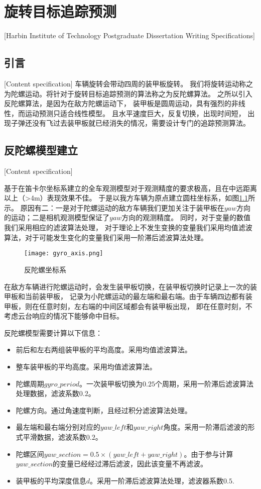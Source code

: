 

\chapter[旋转目标追踪预测]{旋转目标追踪预测}[Harbin Institute of Technology Postgraduate Dissertation Writing Specifications]

\section{引言}[Content specification]
车辆旋转会带动四周的装甲板旋转。
我们将旋转运动称之为陀螺运动。将针对于旋转目标追踪预测的算法称之为反陀螺算法。
之所以引入反陀螺算法，是因为在敌方陀螺运动下，
装甲板是圆周运动，具有强烈的非线性，而运动预测只适合线性模型。
且水平速度巨大，反复切换，出现时间短，
出现子弹还没有飞过去装甲板就已经消失的情况，需要设计专门的追踪预测算法。

\section{反陀螺模型建立}[Content specification]

基于在笛卡尔坐标系建立的全车观测模型对于观测精度的要求极高，且在中远距离以上（>4m）表现效果不佳。
于是以我方车辆为原点建立圆柱坐标系，如图\ref{反陀螺坐标系}所示。
原因有二：一是对于陀螺运动的敌方车辆我们更加关注于装甲板在$yaw$方向的运动；二是相机观测模型保证了$yaw$方向的观测精度。
同时，对于变量的数值我们采用相应的滤波算法处理，
对于理论上不发生变换的变量我们采用均值滤波算法，对于可能发生变化的变量我们采用一阶滞后滤波算法处理。
\begin{figure}[H]
    \centering
    \texttt{[image: gyro\_axis.png]} 
    \caption{反陀螺坐标系} 
    \label{反陀螺坐标系}
\end{figure}



\par
在敌方车辆进行陀螺运动时，会发生装甲板切换，在装甲板切换时记录上一次的装甲板和当前装甲板，
记录为小陀螺运动的最左端和最右端。由于车辆四边都有装甲板，则在任意时刻，左右端的中间区域都会有装甲板出现，
即在任意时刻，不考虑云台响应的情况下能够命中目标。


反陀螺模型需要计算以下信息：
\begin{itemize}[itemindent=2em]
    \item 前后和左右两组装甲板的平均高度。采用均值滤波算法。
    \item 整车装甲板的平均高度。采用均值滤波算法。
    \item 陀螺周期$gyro\_period$。一次装甲板切换为$0.25$个周期，采用一阶滞后滤波算法处理数据，滤波系数$0.2$。
    \item 陀螺方向。通过角速度判断，且经过积分滤波算法处理。
    \item 最左端和最右端分别对应的$yaw\_left$和$yaw\_right$角度。采用一阶滞后滤波的形式平滑数据，滤波系数$0.2$。
    \item 陀螺区间$yaw\_section =0.5 \times (yaw\_left + yaw\_right)$。由于参与计算$yaw\_section$的变量已经经过滞后滤波，因此该变量不再滤波。
    \item 装甲板的平均深度信息$d$。采用一阶滞后滤波算法处理，滤波器系数$0.5$.
\end{itemize}

